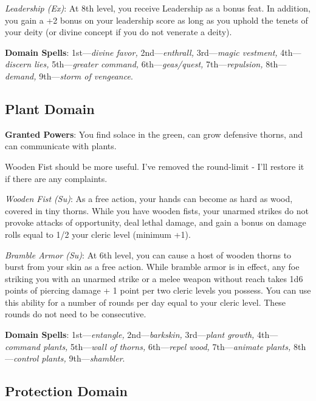 \textit{Leadership (Ex)}: At 8th level, you receive Leadership as a bonus feat. In addition, you gain a +2 bonus 
on your leadership score as long as you uphold the tenets of your deity (or divine concept if you do not venerate
a deity). 

\textbf{Domain Spells}: 1st---\textit{divine favor, }2nd---\textit{enthrall,} 3rd---\textit{magic vestment, }4th---\textit{discern lies, }5th---\textit{greater command, }6th---\textit{geas/quest, }7th---\textit{repulsion, }8th---\textit{demand, }9th---\textit{storm of vengeance}.

\subsection{Plant Domain}


\textbf{Granted Powers}: You find solace in the green, can grow defensive thorns, and can communicate with plants.

\begin{formal}
 Wooden Fist should be more useful. I've removed the round-limit - I'll restore it if there are any complaints.
\end{formal}

\textit{Wooden Fist (Su)}: As a free action, your hands can become as hard as wood, covered in tiny thorns. While
you have wooden fists, your unarmed strikes do not provoke attacks of opportunity, deal lethal damage, and gain a
bonus on damage rolls equal to 1/2 your cleric level (minimum +1).

\textit{Bramble Armor (Su)}: At 6th level, you can cause a host of wooden thorns to burst from your skin as a
free action. While bramble armor is in effect, any foe striking you with an unarmed strike or a melee weapon
without reach takes 1d6 points of piercing damage + 1 point per two cleric levels you possess. You can use this
ability for a number of rounds per day equal to your cleric level. These rounds do not need to be consecutive.

\textbf{Domain Spells}: 1st---\textit{entangle, }2nd---\textit{barkskin,} 3rd---\textit{plant growth, }4th---\textit{command plants, }5th---\textit{wall of thorns, }6th---\textit{repel wood, }7th---\textit{animate plants, }8th---\textit{control plants, }9th---\textit{shambler}.

\subsection{Protection Domain}

